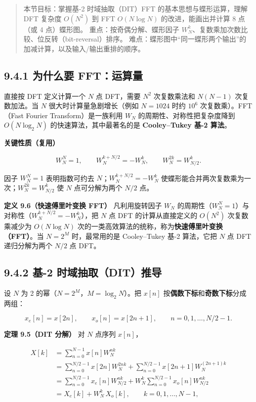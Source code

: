 \begin{quote}
本节目标：掌握基-2 时域抽取（DIT）FFT 的基本思想与蝶形运算，理解 DFT
复杂度 \(O(N^2)\) 到 FFT \(O(N\log N)\) 的改进，能画出并计算 8 点（或 4
点）蝶形图。 重点：按奇偶分解、蝶形因子
\(W_N^k\)、复数乘加次数比较、位反转（bit-reversal）排序。
难点：蝶形图中``同一蝶形两个输出''的加减计算，以及输入/输出重排的顺序。
\end{quote}

\subsection{9.4.1 为什么要
FFT：运算量}\label{ux4e3aux4ec0ux4e48ux8981-fftux8fd0ux7b97ux91cf}

直接按 DFT 定义计算一个 \(N\) 点 DFT，需要 \(N^2\) 次复数乘法和
\(N(N-1)\) 次复数加法。当 \(N\) 很大时计算量急剧增长（例如 \(N=1024\)
时约 \(10^6\) 次复数乘）。FFT（Fast Fourier Transform）是一族利用
\(W_N\) 的周期性、对称性把复杂度降到 \(O(N\log_2 N)\)
的快速算法，其中最著名的是 \textbf{Cooley--Tukey 基-2 算法}。

\textbf{关键性质（复用）}

\[
W_N^N=1,\qquad W_N^{k+N/2}=-W_N^{k},\qquad W_N^{2k}=W_{N/2}^{k}.
\]

因子 \(W_N^N=1\) 表明指数可约去 \(N\)；\(W_N^{k+N/2}=-W_N^k\)
使蝶形能合并两次复数乘为一次；\(W_N^{2k}=W_{N/2}^{k}\) 使 \(N\)
点可分解为两个 \(N/2\) 点。

\textbf{定义 9.6（快速傅里叶变换 FFT）} 凡利用旋转因子 \(W_N\)
的周期性（\(W_N^N=1\)）与对称性（\(W_N^{k+N/2}=-W_N^k\)），把 \(N\) 点
DFT 的计算从直接定义的 \(O(N^2)\) 次复数乘减少为 \(O(N\log N)\)
次的一类高效算法的统称，称为\textbf{快速傅里叶变换（FFT）}。当 \(N=2^M\)
时，最常用的是 Cooley--Tukey 基-2 算法，它把 \(N\) 点 DFT 递归分解为两个
\(N/2\) 点 DFT。

\subsection{9.4.2 基-2
时域抽取（DIT）推导}\label{ux57fa-2-ux65f6ux57dfux62bdux53d6ditux63a8ux5bfc}

设 \(N\) 为 2 的幂（\(N=2^M\)，\(M=\log_2 N\)）。把 \(x[n]\)
按\textbf{偶数下标}和\textbf{奇数下标}分成两组：

\[
x_e[n]=x[2n],\qquad x_o[n]=x[2n+1],\qquad n=0,1,\ldots,N/2-1 .
\]

\textbf{定理 9.5（DIT 分解）} 对 \(N\) 点序列 \(x[n]\)，

\[
\begin{aligned}
X[k] &= \sum_{n=0}^{N-1}x[n]W_N^{nk}\\
&= \sum_{n=0}^{N/2-1}x[2n]W_N^{2nk} + \sum_{n=0}^{N/2-1}x[2n+1]W_N^{(2n+1)k}\\
&= \sum_{n=0}^{N/2-1}x_e[n]W_{N/2}^{nk} + W_N^{k}\sum_{n=0}^{N/2-1} x_o[n]W_{N/2}^{nk}\\
&= X_e[k] + W_N^{k}\,X_o[k],\qquad k=0,1,\ldots,N-1 ,
\end{aligned}
\]

